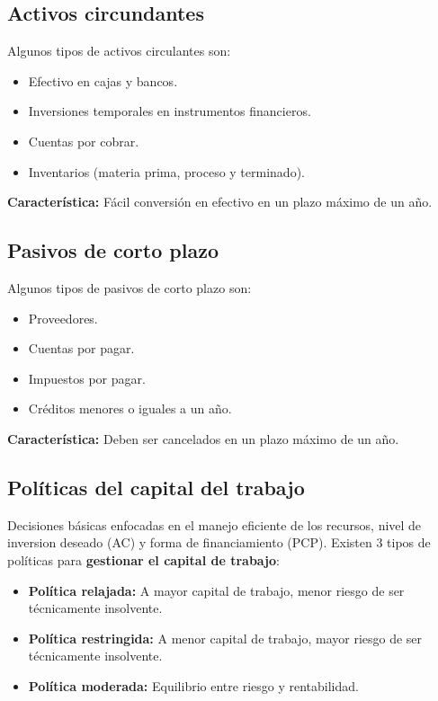 \documentclass{templateNote}
\begin{document}
\subsection{Activos circundantes}
\noindent Algunos tipos de activos circulantes son:
\begin{itemize}
    \item Efectivo en cajas y bancos.
    \item Inversiones temporales en instrumentos financieros.
    \item Cuentas por cobrar.
    \item Inventarios (materia prima, proceso y terminado).
\end{itemize}
\textbf{Característica:} Fácil conversión en efectivo en un plazo máximo de un año. 

\subsection{Pasivos de corto plazo}
\noindent Algunos tipos de pasivos de corto plazo son:
\begin{itemize}
    \item Proveedores.
    \item Cuentas por pagar.
    \item Impuestos por pagar. 
    \item Créditos menores o iguales a un año.
\end{itemize}
\textbf{Característica:} Deben ser cancelados en un plazo máximo de un año.

\subsection{Políticas del capital del trabajo}
\noindent Decisiones básicas enfocadas en el manejo eficiente de los recursos, nivel de inversion deseado (AC) y forma de financiamiento (PCP). Existen 3 tipos de políticas para \textbf{gestionar el capital de trabajo}:
\begin{itemize}
    \item \textbf{Política relajada:} A mayor capital de trabajo, menor riesgo de ser técnicamente insolvente.
    \item \textbf{Política restringida:} A menor capital de trabajo, mayor riesgo de ser técnicamente insolvente.
    \item \textbf{Política moderada:} Equilibrio entre riesgo y rentabilidad.
\end{itemize}
\end{document}
